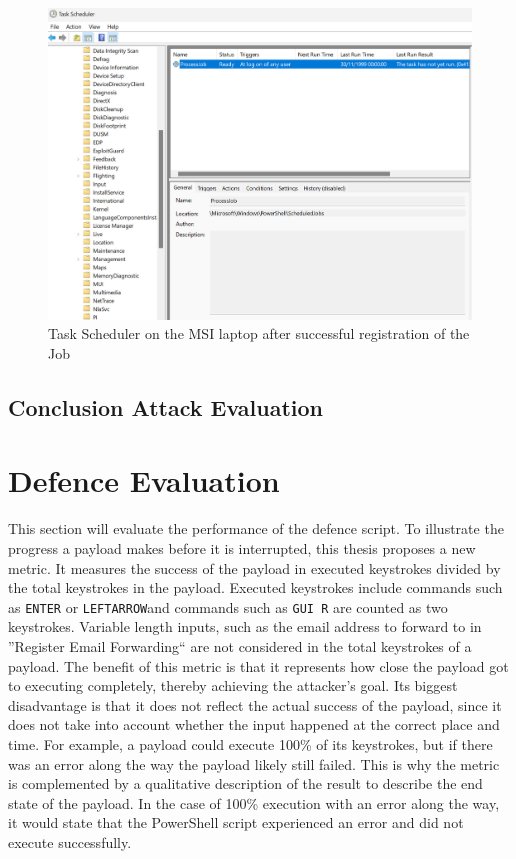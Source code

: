 \begin{figure}[H]
    \centering
    \includegraphics[width=0.5\linewidth]{visuals/task_scheduler_MSI.jpeg}
    \caption{Task Scheduler on the MSI laptop after successful registration of the Job}
    \label{fig:TaskScheduler}
\end{figure}



\subsection{Conclusion Attack Evaluation}


\section{Defence Evaluation} \label{defence evaluation}


This section will evaluate the performance of the defence script. To illustrate the progress a payload makes before it is interrupted, this thesis proposes a new metric. It measures the success of the payload in executed keystrokes divided by the total keystrokes in the payload. Executed keystrokes include commands such as \verb|ENTER| or \verb|LEFTARROW|and commands such as \verb|GUI R| are counted as two keystrokes. Variable length inputs, such as the email address to forward to in ''Register Email Forwarding`` are not considered in the total keystrokes of a payload. The benefit of this metric is that it represents how close the payload got to executing completely, thereby achieving the attacker's goal. Its biggest disadvantage is that it does not reflect the actual success of the payload, since it does not take into account whether the input happened at the correct place and time. For example, a payload could execute 100\% of its keystrokes, but if there was an error along the way the payload likely still failed. This is why the metric is complemented by a qualitative description of the result to describe the end state of the payload. In the case of 100\% execution with an error along the way, it would state that the PowerShell script experienced an error and did not execute successfully. 

